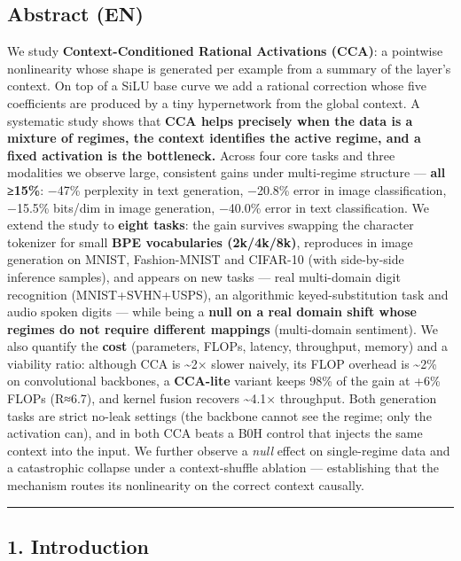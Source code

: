 \documentclass[
  11pt,
]{article}
\begin{document}
\subsection{Abstract (EN)}\label{abstract-en}

We study \textbf{Context-Conditioned Rational Activations (CCA)}: a
pointwise nonlinearity whose shape is generated per example from a
summary of the layer's context. On top of a SiLU base curve we add a
rational correction whose five coefficients are produced by a tiny
hypernetwork from the global context. A systematic study shows that
\textbf{CCA helps precisely when the data is a mixture of regimes, the
context identifies the active regime, and a fixed activation is the
bottleneck.} Across four core tasks and three modalities we observe
large, consistent gains under multi-regime structure --- \textbf{all
≥15\%}: −47\% perplexity in text generation, −20.8\% error in image
classification, −15.5\% bits/dim in image generation, −40.0\% error in
text classification. We extend the study to \textbf{eight tasks}: the
gain survives swapping the character tokenizer for small \textbf{BPE
vocabularies (2k/4k/8k)}, reproduces in image generation on MNIST,
Fashion-MNIST and CIFAR-10 (with side-by-side inference samples), and
appears on new tasks --- real multi-domain digit recognition
(MNIST+SVHN+USPS), an algorithmic keyed-substitution task and audio
spoken digits --- while being a \textbf{null on a real domain shift
whose regimes do not require different mappings} (multi-domain
sentiment). We also quantify the \textbf{cost} (parameters, FLOPs,
latency, throughput, memory) and a viability ratio: although CCA is
\textasciitilde2× slower naively, its FLOP overhead is
\textasciitilde2\% on convolutional backbones, a \textbf{CCA-lite}
variant keeps 98\% of the gain at +6\% FLOPs (R≈6.7), and kernel fusion
recovers \textasciitilde4.1× throughput. Both generation tasks are
strict no-leak settings (the backbone cannot see the regime; only the
activation can), and in both CCA beats a B0H control that injects the
same context into the input. We further observe a \emph{null} effect on
single-regime data and a catastrophic collapse under a context-shuffle
ablation --- establishing that the mechanism routes its nonlinearity on
the correct context causally.

\begin{center}\rule{0.5\linewidth}{0.5pt}\end{center}

\subsection{1. Introduction}\label{introduction}
\end{document}
